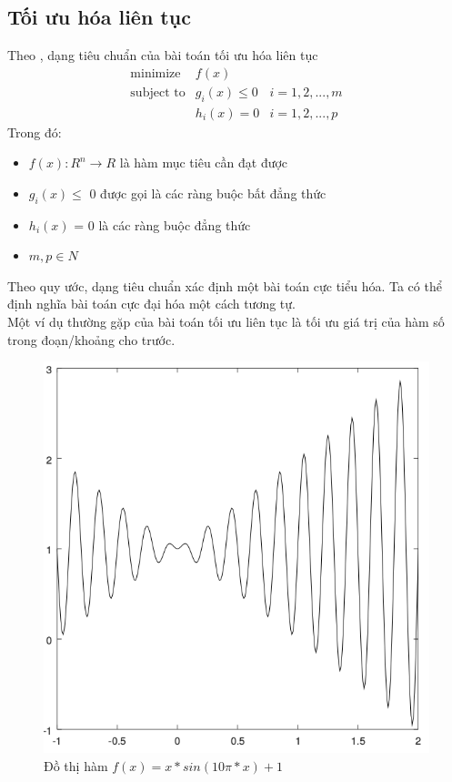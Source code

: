 \subsection{Tối ưu hóa liên tục}
Theo \cite{convex_optimization}, dạng tiêu chuẩn của bài toán tối ưu hóa liên tục 
\[\begin{array}{lll}
    \mbox{minimize} & f(x)\\
    \mbox{subject to} & g_i(x) \leq 0 & i = 1, 2, ..., m\\
    \mbox{} & h_i(x) = 0 & i = 1, 2, ..., p\end{array}\]
Trong đó:
\begin{itemize}
    \item $f(x): R^n \rightarrow R$ là hàm mục tiêu cần đạt được 
    \item $g_i(x) \leq$ 0 được gọi là các ràng buộc bất đẳng thức 
    \item $h_i(x)$ = 0 là các ràng buộc đẳng thức 
    \item $m, p \in N$
\end{itemize}
Theo quy ước, dạng tiêu chuẩn xác định một bài toán cực tiểu hóa. Ta có thể định nghĩa bài toán cực đại hóa một cách tương tự.
\\Một ví dụ thường gặp của bài toán tối ưu liên tục là tối ưu giá trị của hàm số trong đoạn/khoảng cho trước.
\begin{figure}[H]
    \centering
    \includegraphics[width=0.8\linewidth]{picture/continuous_func.png}
    \caption{Đồ thị hàm $f(x) = x * sin(10\pi * x) + 1$}
\end{figure}
